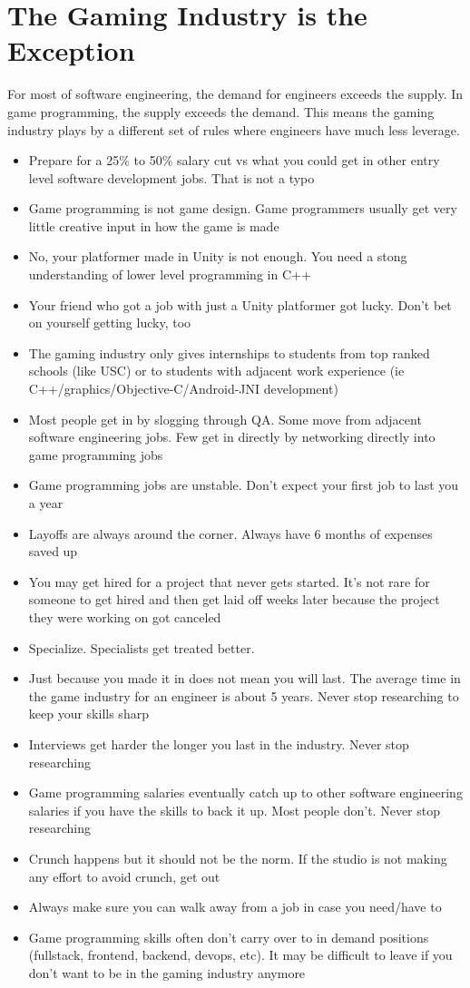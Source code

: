 \documentclass[12pt]{article}
\begin{document}
\section{The Gaming Industry is the Exception}
For most of software engineering, the demand for engineers exceeds the supply. In game programming, the supply exceeds the demand. This means the gaming industry plays by a different set of rules where engineers have much less leverage.
\begin{itemize}
  \item Prepare for a 25\% to 50\% salary cut vs what you could get in other entry level software development jobs. That is not a typo
  \item Game programming is not game design. Game programmers usually get very little creative input in how the game is made
  \item No, your platformer made in Unity is not enough. You need a stong understanding of lower level programming in C++
  \item Your friend who got a job with just a Unity platformer got lucky. Don't bet on yourself getting lucky, too
  \item The gaming industry only gives internships to students from top ranked schools (like USC) or to students with adjacent work experience (ie C++/graphics/Objective-C/Android-JNI development)
  \item Most people get in by slogging through QA. Some move from adjacent software engineering jobs. Few get in directly by networking directly into game programming jobs
  \item Game programming jobs are unstable. Don't expect your first job to last you a year
  \item Layoffs are always around the corner. Always have 6 months of expenses saved up
  \item You may get hired for a project that never gets started. It's not rare for someone to get hired and then get laid off weeks later because the project they were working on got canceled
  \item Specialize. Specialists get treated better.
  \item Just because you made it in does not mean you will last. The average time in the game industry for an engineer is about 5 years. Never stop researching to keep your skills sharp
  \item Interviews get harder the longer you last in the industry. Never stop researching
  \item Game programming salaries eventually catch up to other software engineering salaries if you have the skills to back it up. Most people don't. Never stop researching
  \item Crunch happens but it should not be the norm. If the studio is not making any effort to avoid crunch, get out 
  \item Always make sure you can walk away from a job in case you need/have to
  \item Game programming skills often don't carry over to in demand positions (fullstack, frontend, backend, devops, etc). It may be difficult to leave if you don't want to be in the gaming industry anymore
\end{itemize}
\end{document}
